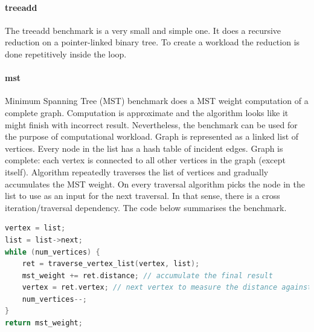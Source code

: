 \paragraph{treeadd} The treeadd benchmark is a very small and simple one. It does a recursive reduction on a pointer-linked binary tree. To create a workload the reduction is done repetitively inside the loop.   

\paragraph{mst} Minimum Spanning Tree (MST) benchmark does a MST weight computation of a complete graph. Computation is approximate and the algorithm looks like it might finish with incorrect result. Nevertheless, the benchmark can be used for the purpose of computational workload. Graph is represented as a linked list of vertices. Every node in the list has a hash table of incident edges. Graph is complete: each vertex is connected to all other vertices in the graph (except itself). Algorithm repeatedly traverses the list of vertices and gradually accumulates the MST weight. On every traversal algorithm picks the node in the list to use as an input for the next traversal. In that sense, there is a cross iteration/traversal dependency. The code below summarises the benchmark.\newline\null
\begin{minipage}[t]{\linewidth}
\begin{lstlisting}[caption={The main algorithm of mst benchmark.},label={lst:mst_code},language=C]
vertex = list;
list = list->next;
while (num_vertices) {
    ret = traverse_vertex_list(vertex, list);
    mst_weight += ret.distance; // accumulate the final result
    vertex = ret.vertex; // next vertex to measure the distance against
    num_vertices--;
}
return mst_weight;
\end{lstlisting}
\end{minipage}

